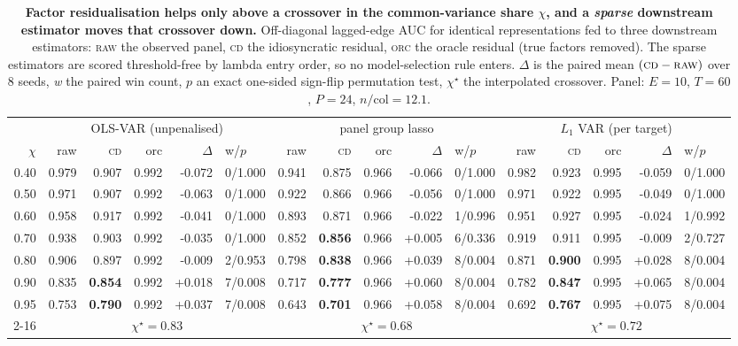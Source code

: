 \begin{table}[t]\centering\small
\setlength{\tabcolsep}{3.2pt}
\caption{\textbf{Factor residualisation helps only above a crossover in the
common-variance share $\chi$, and a \emph{sparse} downstream estimator moves that
crossover down.} Off-diagonal lagged-edge AUC for identical representations fed to
three downstream estimators: \textsc{raw} the observed panel, \textsc{cd} the \cafe{}
idiosyncratic residual, \textsc{orc} the oracle residual (true factors removed). The
sparse estimators are scored threshold-free by lambda entry order, so no model-selection
rule enters. $\Delta$ is the paired mean $(\textsc{cd}-\textsc{raw})$ over 8
seeds, \emph{w} the paired win count, $p$ an exact one-sided sign-flip permutation test,
$\chi^\star$ the interpolated crossover. Panel: $E{=}10$, $T{=}60$, $P{=}24$,
$n/\mathrm{col}{=}12.1$.}
\label{tab:gate}
\begin{tabular}{r|rrrr@{\ }l|rrrr@{\ }l|rrrr@{\ }l}
\toprule
 & \multicolumn{5}{c}{OLS-VAR (unpenalised)} & \multicolumn{5}{c}{panel group lasso} & \multicolumn{5}{c}{$L_1$ VAR (per target)} \\
$\chi$ & raw & \textsc{cd} & orc & $\Delta$ & w/$p$ & raw & \textsc{cd} & orc & $\Delta$ & w/$p$ & raw & \textsc{cd} & orc & $\Delta$ & w/$p$ \\
\midrule
0.40 & 0.979 & 0.907 & 0.992 & -0.072 & 0/1.000 & 0.941 & 0.875 & 0.966 & -0.066 & 0/1.000 & 0.982 & 0.923 & 0.995 & -0.059 & 0/1.000 \\
0.50 & 0.971 & 0.907 & 0.992 & -0.063 & 0/1.000 & 0.922 & 0.866 & 0.966 & -0.056 & 0/1.000 & 0.971 & 0.922 & 0.995 & -0.049 & 0/1.000 \\
0.60 & 0.958 & 0.917 & 0.992 & -0.041 & 0/1.000 & 0.893 & 0.871 & 0.966 & -0.022 & 1/0.996 & 0.951 & 0.927 & 0.995 & -0.024 & 1/0.992 \\
0.70 & 0.938 & 0.903 & 0.992 & -0.035 & 0/1.000 & 0.852 & \textbf{0.856} & 0.966 & +0.005 & 6/0.336 & 0.919 & 0.911 & 0.995 & -0.009 & 2/0.727 \\
0.80 & 0.906 & 0.897 & 0.992 & -0.009 & 2/0.953 & 0.798 & \textbf{0.838} & 0.966 & +0.039 & 8/0.004 & 0.871 & \textbf{0.900} & 0.995 & +0.028 & 8/0.004 \\
0.90 & 0.835 & \textbf{0.854} & 0.992 & +0.018 & 7/0.008 & 0.717 & \textbf{0.777} & 0.966 & +0.060 & 8/0.004 & 0.782 & \textbf{0.847} & 0.995 & +0.065 & 8/0.004 \\
0.95 & 0.753 & \textbf{0.790} & 0.992 & +0.037 & 7/0.008 & 0.643 & \textbf{0.701} & 0.966 & +0.058 & 8/0.004 & 0.692 & \textbf{0.767} & 0.995 & +0.075 & 8/0.004 \\
\cmidrule{2-16}
\multicolumn{1}{r|}{crossover} & \multicolumn{5}{c}{$\chi^\star=0.83$} & \multicolumn{5}{c}{$\chi^\star=0.68$} & \multicolumn{5}{c}{$\chi^\star=0.72$} \\
\bottomrule
\end{tabular}
\end{table}
